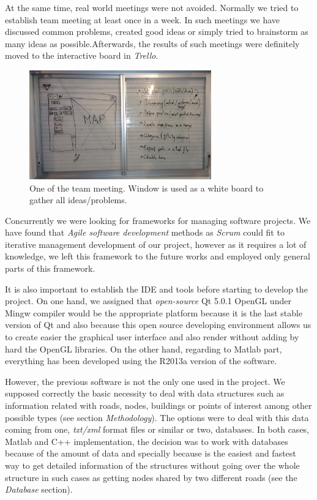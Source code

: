\documentclass{article}
\begin{document}
At the same time, real world meetings were not avoided. Normally we tried to establish team meeting at least once in a week. In such meetings we have discussed common problems, created good ideas or simply tried to brainstorm as many ideas as possible.Afterwards, the results of such meetings were definitely moved to the interactive board in \textit{Trello}.

\begin{figure}[!h]
\centering
\includegraphics[width=0.7\textwidth]{windowBoard.jpg}
\caption{One of the team meeting. Window is used as a white board to gather all ideas/problems.}
\end{figure}

Concurrently we were looking for frameworks for managing software projects. We have found that \textit{Agile software development} methods as \textit{Scrum} could fit to iterative management development of our project, however as it requires a lot of knowledge, we left this framework to the future works and employed only general parts of this framework.

It is also important to establish the IDE and tools before starting to develop the project. On one hand, we assigned that \textit{open-source} Qt 5.0.1 OpenGL under Mingw compiler would be the appropriate platform because it is the last stable version of Qt and also because this open source developing environment allows us to create easier the graphical user interface and also render without adding by hard the OpenGL libraries. On the other hand, regarding to Matlab part, everything has been developed using the R2013a version of the software.

However, the previous software is not the only one used in the project. We supposed correctly the basic necessity to deal with data structures such as information related with roads, nodes, buildings or points of interest among other possible types (see section \textit{Methodology}). The options were to deal with this data coming from one, \textit{txt/xml} format files or similar or two, databases.
In both cases, Matlab and C++ implementation, the decision was to work with databases because of the amount of data and specially because is the easiest and fastest way to get detailed information of the structures without going over the whole structure in such cases as getting nodes shared by two different roads (see the \textit{Database} section).
\end{document}
